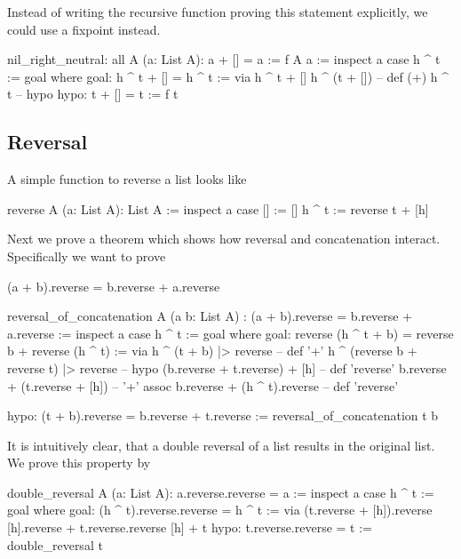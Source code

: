Instead of writing the recursive function proving this statement explicitly,
we could use a fixpoint instead.

\begin{alba}
  nil_right_neutral: all A (a: List A): a + [] = a :=
    f A a :=
      inspect a case
        h ^ t :=
          goal where
            goal: h ^ t + [] = h ^ t :=
              via
                h ^ t + []
                h ^ (t + [])   -- def (+)
                h ^ t          -- hypo
            hypo: t + [] = t :=
              f t
\end{alba}



\subsection{Reversal}



A simple function to reverse a list looks like

\begin{alba}
  reverse A (a: List A): List A :=
    inspect a case
      [] :=
        []
      h ^ t :=
        reverse t + [h]
\end{alba}


Next we prove a theorem which shows how reversal and concatenation
interact. Specifically we want to prove
\begin{alba}
  (a + b).reverse = b.reverse + a.reverse
\end{alba}

\begin{alba}
  reversal_of_concatenation
    A
    (a b: List A)
    : (a + b).reverse = b.reverse + a.reverse :=
      inspect a case
        h ^ t :=
          goal where
             goal: reverse (h ^ t + b) = reverse b + reverse (h ^ t) :=
               via
                 h ^ (t + b) |> reverse                     -- def '+'
                 h ^ (reverse b + reverse t) |> reverse     -- hypo
                 (b.reverse + t.reverse) + [h]              -- def 'reverse'
                 b.reverse + (t.reverse + [h])              -- '+' assoc
                 b.reverse + (h ^ t).reverse                -- def 'reverse'

             hypo: (t + b).reverse = b.reverse + t.reverse :=
               reversal_of_concatenation t b
\end{alba}


It is intuitively clear, that a double reversal of a list results in the
original list. We prove this property by
%
\begin{alba}
  double_reversal A (a: List A): a.reverse.reverse = a :=
    inspect a case
      h ^ t :=
        goal where
          goal: (h ^ t).reverse.reverse = h ^ t :=
            via
              (t.reverse + [h]).reverse
              [h].reverse + t.reverse.reverse
              [h] + t
          hypo: t.reverse.reverse = t :=
            double_reversal t
\end{alba}



